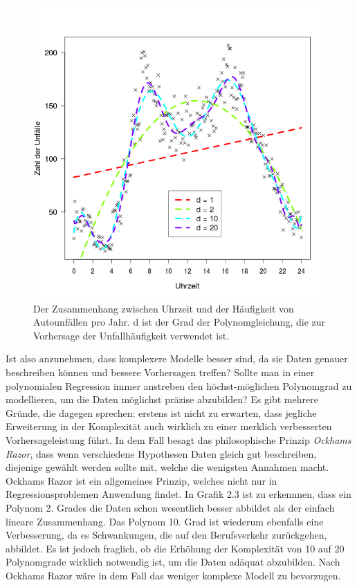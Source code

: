 \begin{figure}[!ht]
  \caption{Der Zusammenhang zwischen Uhrzeit und der Häufigkeit von Autounfällen pro
    Jahr.  d ist der Grad der Polynomgleichung, die zur Vorhersage der
    Unfallhäufigkeit verwendet ist.}  \centering
  \includegraphics[width=1\textwidth]{chapters/svm/poly_2.png}
\end{figure}


Ist also anzunehmen, dass komplexere Modelle besser sind, da sie Daten genauer
beschreiben können und bessere Vorhersagen treffen? Sollte man in einer polynomialen
Regression immer anstreben den höchst-möglichen Polynomgrad zu modellieren, um die
Daten möglichst präzise abzubilden? Es gibt mehrere Gründe, die dagegen sprechen:
erstens ist nicht zu erwarten, dass jegliche Erweiterung in der Komplexität auch
wirklich zu einer merklich verbesserten Vorhersageleistung führt. In dem Fall besagt
das philosophische Prinzip \emph{Ockhams Razor}, dass wenn verschiedene Hypothesen
Daten gleich gut beschreiben, diejenige gewählt werden sollte mit, welche die
wenigsten Annahmen macht.  Ockhams Razor ist ein allgemeines Prinzip, welches nicht
nur in Regressionsproblemen Anwendung findet. In Grafik 2.3 ist zu erkennnen, dass
ein Polynom 2. Grades die Daten schon wesentlich besser abbildet als der einfach
lineare Zusammenhang. Das Polynom 10. Grad ist wiederum ebenfalls eine Verbesserung,
da es Schwankungen, die auf den Berufsverkehr zurückgehen, abbildet. Es ist jedoch
fraglich, ob die Erhöhung der Komplexität von 10 auf 20 Polynomgrade wirklich
notwendig ist, um die Daten adäquat abzubilden. Nach Ockhams Razor wäre in dem Fall
das weniger komplexe Modell zu bevorzugen.

